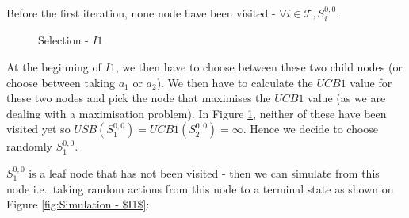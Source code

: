 Before the first iteration, none node have been visited - $\forall i \in \mathcal{T}, S^{0,0}_{i}$.
\begin{figure}[!ht]
    \centering
    \caption{Selection - $I1$}
    \label{fig:Expansion of the tree from the root node}
\end{figure}
At the beginning of $I1$, we then have to choose between these two child nodes (or choose between taking $a_1$ or $a_2$). We then have to calculate the $UCB1$ value for these two nodes and pick the node that maximises the $UCB1$ value (as we are dealing with a maximisation problem).
In Figure \ref{fig:Expansion of the tree from the root node}, neither of these have been visited yet so $USB(S^{0,0}_1)=UCB1(S^{0,0}_2)=\infty$. Hence we decide to choose randomly $S^{0,0}_1$.

$S^{0,0}_1$ is a leaf node that has not been visited - then we can simulate from this node i.e.\ taking random actions from this node to a terminal state as shown on Figure \ref{fig:Simulation - $I1$}:

